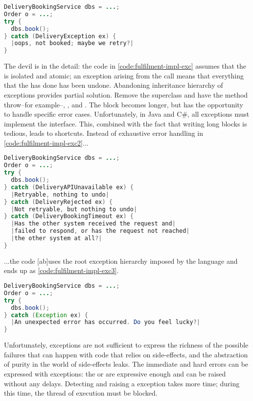 \begin{lstlisting}[caption={Exceptions}, label={code:fulfilment-impl-exc}, language=Java, escapechar=|]
DeliveryBookingService dbs = ...;
Order o = ...;
try {
  dbs.book();
} catch (DeliveryException ex) {
  |oops, not booked; maybe we retry?|
}
\end{lstlisting}

The devil is in the detail: the code in \autoref{code:fulfilment-impl-exc} assumes that the  is isolated and atomic; an exception arising from the call means that everything that the  has done has been undone. Abandoning inheritance hierarchy of exceptions provides partial solution. Remove the  superclass and have the method throw--for example--, , and . The  block becomes longer, but has the opportunity to handle specific error cases. Unfortunately, in Java and C\#, all exceptions must implement the  interface. This, combined with the fact that writing long  blocks is tedious, leads to shortcuts. Instead of exhaustive error handling in \autoref{code:fulfilment-impl-exc2}...

\begin{lstlisting}[caption={Exceptions}, label={code:fulfilment-impl-exc2}, language=Java, escapechar=|]
DeliveryBookingService dbs = ...;
Order o = ...;
try {
  dbs.book();
} catch (DeliveryAPIUnavailable ex) { 
  |Retryable, nothing to undo|
} catch (DeliveryRejected ex) {
  |Not retryable, but nothing to undo|
} catch (DeliveryBookingTimeout ex) {
  |Has the other system received the request and|
  |failed to respond, or has the request not reached|
  |the other system at all?|
}
\end{lstlisting}

...the code [ab]uses the root exception hierarchy imposed by the language and ends up as \autoref{code:fulfilment-impl-exc3}.

\begin{lstlisting}[caption={Exceptions}, label={code:fulfilment-impl-exc3}, language=Java, escapechar=|]
DeliveryBookingService dbs = ...;
Order o = ...;
try {
  dbs.book();
} catch (Exception ex) { 
  |An unexpected error has occurred. Do you feel lucky?|
}
\end{lstlisting}

Unfortunately, exceptions are not sufficient to express the richness of the possible failures that can happen with code that relies on side-effects, and the abstraction of purity in the world of side-effects leaks. The immediate and hard errors can be expressed with exceptions: the  or  are expressive enough and can be raised without any delays. Detecting and raising a  exception takes more time; during this time, the thread of execution must be blocked. 

